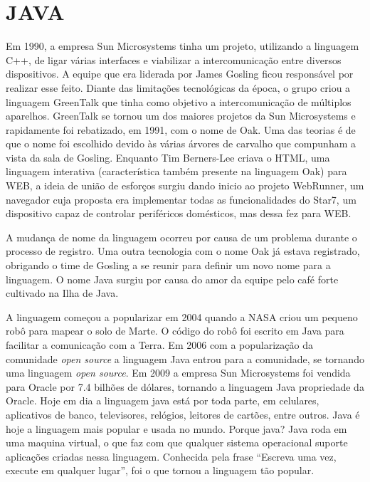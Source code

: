 \documentclass[
    12pt,               %
    openany,            %
    twoside,            %
    a4paper,            %
    brazil              %
    ]{abntex2}
\begin{document}
\section{JAVA}

Em 1990, a empresa Sun Microsystems tinha um projeto, utilizando a linguagem
C++, de ligar várias interfaces e viabilizar a intercomunicação entre diversos
dispositivos.  A equipe que era liderada por James Gosling ficou responsável
por realizar esse feito. Diante das limitações tecnológicas da época, o grupo
criou a linguagem GreenTalk que tinha como objetivo a intercomunicação de
múltiplos aparelhos.  GreenTalk se tornou um dos maiores projetos da Sun
Microsystems e rapidamente foi rebatizado, em 1991, com o nome de Oak. Uma das
teorias é de que o nome foi escolhido devido às várias árvores de carvalho que
compunham a vista da sala de Gosling. Enquanto Tim Berners-Lee criava o HTML,
uma linguagem interativa (característica também presente na linguagem Oak) para
WEB, a ideia de união de esforços surgiu dando inicio ao projeto WebRunner, um
navegador cuja proposta era implementar todas as funcionalidades do Star7, um
dispositivo capaz de controlar periféricos domésticos, mas dessa fez para WEB.

A mudança de nome da linguagem ocorreu por causa de um problema durante o
processo de registro.  Uma outra tecnologia com o nome Oak já estava
registrado, obrigando o time de Gosling a se reunir para definir um novo nome
para a linguagem. O nome Java surgiu por causa do amor da equipe pelo café
forte cultivado na Ilha de Java. 

A linguagem começou a popularizar em 2004 quando a NASA criou um pequeno robô
para mapear o solo de Marte. O código do robô foi escrito em Java para facilitar
a comunicação com a Terra. Em 2006 com a popularização da comunidade
\textit{open source} a linguagem Java entrou para a comunidade, se tornando uma
linguagem \textit{open source}.  Em 2009 a empresa Sun Microsystems foi vendida
para Oracle por 7.4 bilhões de dólares, tornando a linguagem Java propriedade da
Oracle. Hoje em dia a linguagem java está por toda parte, em celulares,
aplicativos de banco, televisores, relógios, leitores de cartões, entre outros.
Java é hoje a linguagem mais popular e usada no mundo.  Porque java?  Java roda
em uma maquina virtual, o que faz com que qualquer sistema operacional suporte
aplicações criadas nessa linguagem. Conhecida pela frase “Escreva uma vez,
execute em qualquer lugar”, foi o que tornou a linguagem tão popular.
\end{document}
